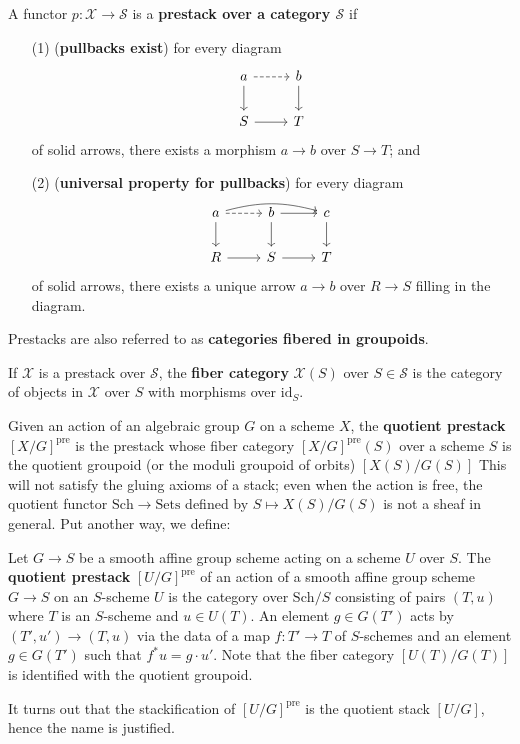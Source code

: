 \documentclass[12pt]{article}
\begin{document}
\begin{definition}[Prestacks]\label{def:prestacks}
A functor $p:\mathcal{X}\to\mathcal{S}$ is a \textbf{prestack over a category $\mathcal{S}$} if
\begin{enumerate}
\item[(1)] (\textbf{pullbacks exist}) for every diagram
\[
\begin{tikzcd}
a \arrow[d] \arrow[r, dashed] & b \arrow[d] \\
S \arrow[r] & T
\end{tikzcd}
\]
of solid arrows, there exists a morphism $a\to b$ over $S\to T$; and

\item[(2)] (\textbf{universal property for pullbacks}) for every diagram
\[
\begin{tikzcd}
a \arrow[d] 
  \arrow[r, dashed] 
  \arrow[rr, bend left=15] & 
b \arrow[d] \arrow[r] & 
c \arrow[d] \\
R \arrow[r] & S \arrow[r] & T
\end{tikzcd}
\]
of solid arrows, there exists a unique arrow $a\to b$ over $R\to S$ filling in the diagram.
\end{enumerate}
Prestacks are also referred to as \textbf{categories fibered in groupoids}. 
\end{definition}

\begin{definition}\label{def:fibercat}
If $\mathcal{X}$ is a prestack over $\mathcal{S}$, the \textbf{fiber category} 
$\mathcal{X}(S)$ over $S\in\mathcal{S}$ is the category of objects in $\mathcal{X}$ over $S$ 
with morphisms over $\mathrm{id}_S$.
\end{definition}

Given an action of an algebraic group $G$ on a scheme $X$, the \textbf{quotient prestack} $[X/G]^{\mathrm{pre}}$ is the prestack whose fiber category 
$[X/G]^{\mathrm{pre}}(S)$ over a scheme $S$ is the quotient groupoid (or the moduli groupoid of orbits) $[X(S)/G(S)]$ 
This will not satisfy the gluing axioms of a stack; even when the action is free, 
the quotient functor $\mathrm{Sch} \to \mathrm{Sets}$ defined by $S \mapsto X(S)/G(S)$ is not a sheaf 
in general. Put another way, we define:
\begin{definition}
Let $G \to S$ be a smooth affine group scheme acting on a scheme $U$ over $S$. 
The \textbf{quotient prestack} $[U/G]^{\mathrm{pre}}$ of an action of a smooth affine group scheme $G \to S$ 
on an $S$-scheme $U$ is the category over $\mathrm{Sch}/S$ consisting of pairs $(T,u)$ where $T$ is an $S$-scheme 
and $u \in U(T)$. An element $g \in G(T')$ acts by $(T',u') \to (T,u)$ via the data of a map $f:T'\to T$ of 
$S$-schemes and an element $g \in G(T')$ such that $f^*u = g \cdot u'$. Note that the fiber category 
$[U(T)/G(T)]$ is identified with the quotient groupoid.
\end{definition}
It turns out that the stackification of $[U/G]^{\mathrm{pre}}$ is the quotient stack $[U/G]$, hence the name is justified.
\end{document}
